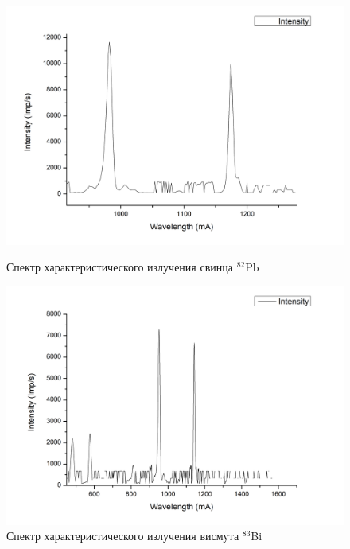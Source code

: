 \documentclass[a4paper]{article}
\begin{document}
\begin{enumerate}
    \begin{figure}[h]
\begin{center}
\begin{minipage}[h]{0.45\linewidth}
\includegraphics[width=1\linewidth]{Pb.png}
\caption{Спектр характеристического излучения свинца $^{82}$Pb} %
\end{minipage}
\hfill 
\begin{minipage}[h]{0.45\linewidth}
\includegraphics[width=1\linewidth]{Bi.png}
\caption{Спектр характеристического излучения висмута $^{83}$Bi}
\label{ris:experimcoded}
\end{minipage}
\end{center}
\end{figure}


\end{enumerate}
\end{document}
